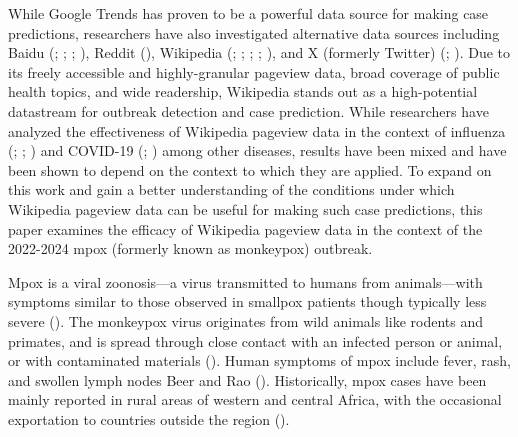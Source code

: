 \documentclass[
  12pt,
]{article}
\begin{document}
While Google Trends has proven to be a powerful data source for making
case predictions, researchers have also investigated alternative data
sources including Baidu (;
; ; ), Reddit
(), Wikipedia
(;
;
;
;
), and X (formerly
Twitter) (;
). Due to its freely
accessible and highly-granular pageview data, broad coverage of public
health topics, and wide readership, Wikipedia stands out as a
high-potential datastream for outbreak detection and case prediction.
While researchers have analyzed the effectiveness of Wikipedia pageview
data in the context of influenza (; ;
) and COVID-19
(;
) among other diseases,
results have been mixed and have been shown to depend on the context to
which they are applied. To expand on this work and gain a better
understanding of the conditions under which Wikipedia pageview data can
be useful for making such case predictions, this paper examines the
efficacy of Wikipedia pageview data in the context of the 2022-2024 mpox
(formerly known as monkeypox) outbreak.

Mpox is a viral zoonosis---a virus transmitted to humans from
animals---with symptoms similar to those observed in smallpox patients
though typically less severe (). The monkeypox virus originates from wild animals like rodents
and primates, and is spread through close contact with an infected
person or animal, or with contaminated materials
(). Human symptoms of mpox include fever, rash, and swollen lymph
nodes Beer and Rao (). Historically, mpox
cases have been mainly reported in rural areas of western and central
Africa, with the occasional exportation to countries outside the region
().
\end{document}
